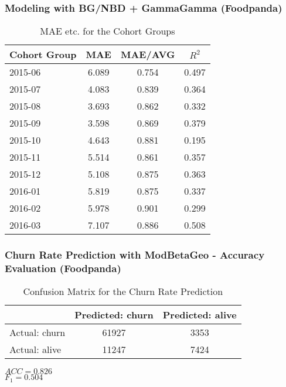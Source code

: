 \documentclass{beamer} %
\theoremstyle{definition} %
\begin{document}
\begin{frame}
\frametitle{Modeling with BG/NBD + GammaGamma (Foodpanda)}
\begin{center}
            \begin{table}
\begin{tabular}{l | c | c | c }
Cohort Group & MAE & MAE/AVG & $R^2$ \\
\hline \hline
2015-06 & 6.089 & 0.754 & 0.497\\ 
2015-07 & 4.083 & 0.839 & 0.364\\
2015-08 & 3.693 & 0.862 & 0.332\\
2015-09 & 3.598 & 0.869 & 0.379\\ 
2015-10 & 4.643 & 0.881 & 0.195\\ 
2015-11 & 5.514 & 0.861 & 0.357\\
2015-12 & 5.108 & 0.875 & 0.363\\
2016-01 & 5.819 & 0.875 & 0.337\\ 
2016-02 & 5.978 & 0.901 & 0.299\\ 
2016-03 & 7.107 & 0.886 & 0.508\\ 
\end{tabular}
\caption{MAE etc. for the Cohort Groups}
\end{table}
        \end{center}
\end{frame}

\begin{frame}
\frametitle{Churn Rate Prediction with ModBetaGeo - Accuracy Evaluation (Foodpanda)}
\begin{center}
            \begin{table}
\begin{tabular}{l | c | c }
 & Predicted: churn & Predicted: alive\\
\hline \hline
Actual: churn & 61927 & 3353\\ 
Actual: alive & 11247 & 7424
\end{tabular}
\caption{Confusion Matrix for the Churn Rate Prediction}
\end{table}
        \end{center}     
       
\begin{rmk}
	$ACC=0.826$ \\
    $F_1=0.504$ 
\end{rmk}
\end{frame}
\end{document}
